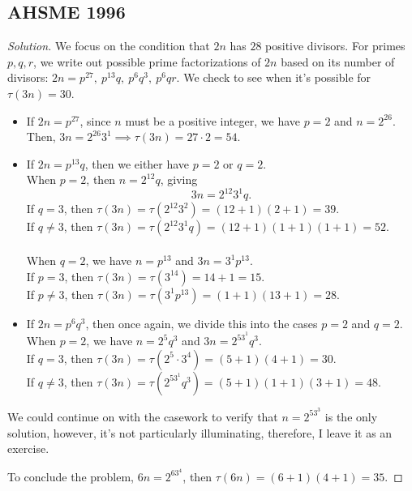 \subsection{AHSME 1996}
\begin{proof}[Solution] We focus on the condition that $2n$ has $28$ positive divisors. For primes $p, q, r$, we write out possible prime factorizations of $2n$ based on its number of divisors: $2n= p^{27},\: p^{13}q,\: p^6q^3,\: p^6qr.$ We check to see when it's possible for $\tau(3n)=30$.

\begin{itemize} 
\item If $2n=p^{27}$, since $n$ must be a positive integer, we have $p=2$ and $n=2^{26}$. Then, $3n=2^{26}3^1\implies \tau(3n)=27\cdot 2=54.$ 

\item If $2n=p^{13}q$, then we either have $p=2$ or $q=2$.\\ \color{blue} When $p=2$\color{black}, then $n=2^{12}q$, giving $$3n=2^{12}3^1q.$$ If $q=3$, then $\tau(3n)=\tau(2^{12}3^2)=(12+1)(2+1)=39$. \\ If $q\neq 3$, then $\tau(3n)=\tau(2^{12}3^1q)=(12+1)(1+1)(1+1)=52.$ \\ \\ \color{blue} When $q=2$\color{black}, we have $n=p^{13}$ and $3n=3^1p^{13}$. \\ If $p=3$, then $\tau(3n)=\tau(3^{14})=14+1=15$. \\ If $p\neq 3$, then $\tau(3n)=\tau(3^1p^{13})=(1+1)(13+1)=28$. 
\clearpage

\item If $2n=p^6q^3$, then once again, we divide this into the cases $p=2$ and $q=2$. \\  \color{blue} When $p=2$\color{black}, we have $n=2^5q^3$ and $3n=2^53^1q^3$. \\
\color{ForestGreen} If $q=3$, then $\tau(3n)=\tau(2^5\cdot 3^4)=(5+1)(4+1)=30$. \\
\color{black} If $q\neq 3$, then $\tau(3n)=\tau(2^53^1q^3)=(5+1)(1+1)(3+1)=48$.
\end{itemize}
We could continue on with the casework to verify that $n=2^53^3$ is the only solution, however, it's not particularly illuminating, therefore, I leave it as an exercise.

To conclude the problem, $6n=2^63^4$, then $\tau(6n)=\left(6+1\right)\left(4+1\right)=\boxed{35}$. \end{proof}

\clearpage

